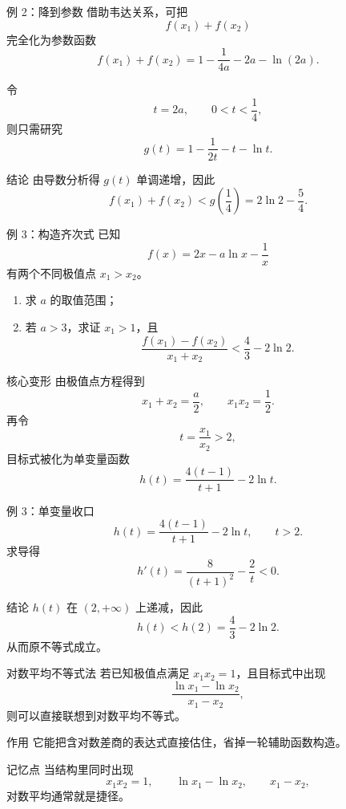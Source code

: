 ﻿\documentclass[aspectratio=169,11pt]{ctexbeamer}
\begin{document}
\begin{frame}[allowframebreaks]{例 2：降到参数}
\small
借助韦达关系，可把
\[
f(x_1)+f(x_2)
\]
完全化为参数函数
\[
f(x_1)+f(x_2)=1-\frac1{4a}-2a-\ln(2a).
\]

令
\[
t=2a,\qquad 0<t<\frac14,
\]
则只需研究
\[
g(t)=1-\frac1{2t}-t-\ln t.
\]

\begin{block}{结论}
由导数分析得 $g(t)$ 单调递增，因此
\[
f(x_1)+f(x_2)<g\!\left(\frac14\right)=2\ln 2-\frac54.
\]
\end{block}
\end{frame}

\begin{frame}[allowframebreaks]{例 3：构造齐次式}
\small
已知
\[
f(x)=2x-a\ln x-\frac1x
\]
有两个不同极值点 $x_1>x_2$。

\begin{enumerate}
  \item 求 $a$ 的取值范围；
  \item 若 $a>3$，求证 $x_1>1$，且
  \[
  \frac{f(x_1)-f(x_2)}{x_1+x_2}<\frac43-2\ln 2.
  \]
\end{enumerate}

\begin{block}{核心变形}
由极值点方程得到
\[
x_1+x_2=\frac a2,\qquad x_1x_2=\frac12.
\]
再令
\[
t=\frac{x_1}{x_2}>2,
\]
目标式被化为单变量函数
\[
h(t)=\frac{4(t-1)}{t+1}-2\ln t.
\]
\end{block}
\end{frame}

\begin{frame}{例 3：单变量收口}
\small
\[
h(t)=\frac{4(t-1)}{t+1}-2\ln t,\qquad t>2.
\]
求导得
\[
h'(t)=\frac{8}{(t+1)^2}-\frac2t<0.
\]

\begin{block}{结论}
$h(t)$ 在 $(2,+\infty)$ 上递减，因此
\[
h(t)<h(2)=\frac43-2\ln 2.
\]
从而原不等式成立。
\end{block}
\end{frame}

\begin{frame}{对数平均不等式法}
\small
若已知极值点满足 $x_1x_2=1$，且目标式中出现
\[
\frac{\ln x_1-\ln x_2}{x_1-x_2},
\]
则可以直接联想到对数平均不等式。

\begin{block}{作用}
它能把含对数差商的表达式直接估住，省掉一轮辅助函数构造。
\end{block}

\begin{alertblock}{记忆点}
当结构里同时出现
\[
x_1x_2=1,\qquad \ln x_1-\ln x_2,\qquad x_1-x_2,
\]
对数平均通常就是捷径。
\end{alertblock}
\end{frame}
\end{document}
